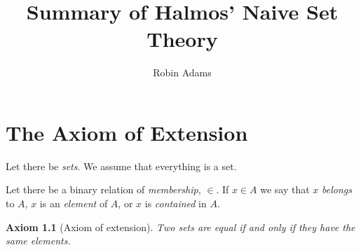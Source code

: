 \documentclass{report}
\title{Summary of Halmos' Naive Set Theory}
\author{Robin Adams}
\newtheorem{ax}{Axiom}
\begin{document}
\maketitle
\tableofcontents

\chapter{The Axiom of Extension}

Let there be \emph{sets}. We assume that everything is a set.

Let there be a binary relation of \emph{membership}, $\in$. If $x \in A$ we say that $x$ \emph{belongs} to $A$, $x$ is an \emph{element} of $A$, or $x$ is \emph{contained} in $A$.

\begin{ax}[Axiom of extension]
Two sets are equal if and only if they have the same elements.
\end{ax}
\end{document}

